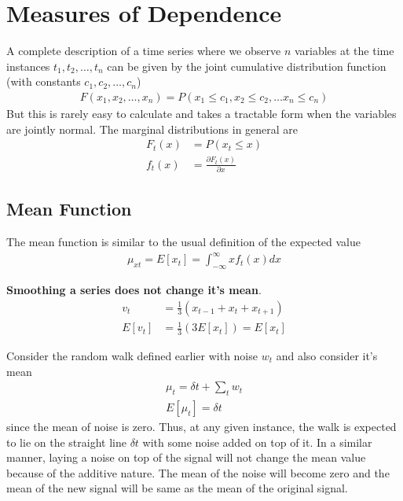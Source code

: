 \documentclass[../../time_series_notes.tex]{subfiles}
\begin{document}
\section{Measures of Dependence}
A complete description of a time series where we observe $n$ variables at the time instances $t_{1}, t_{2}, \ldots, t_{n}$ can be given by the joint cumulative distribution function (with constants $c_{1}, c_{2}, \ldots, c_{n}$)
\begin{align*}
    F(x_{1}, x_{2}, \ldots, x_{n}) = P(x_{1} \leq c_{1}, x_{2} \leq c_{2}, \ldots x_{n} \leq c_{n})
\end{align*}
But this is rarely easy to calculate and takes a tractable form when the variables are jointly normal. The marginal distributions in general are
\begin{align*}
    F_{t}(x) &= P(x_{t} \leq x)\\
    f_{t}(x) &= \frac{\partial F_{t}(x)}{\partial x}
\end{align*}


\subsection{Mean Function} \label{mean_fun}
The mean function is similar to the usual definition of the expected value
\begin{align*}
    \mu_{xt} = E[x_{t}] =  \int_{-\infty}^{\infty} x f_{t}(x) dx
\end{align*}

\textbf{Smoothing a series does not change it's mean}.
\begin{align*}
    v_{t} &= \frac{1}{3}(x_{t-1} + x_{t} + x_{t+1})\\
    E[v_{t}] &= \frac{1}{3}(3E[x_{t}]) = E[x_{t}]
\end{align*}

Consider the random walk defined earlier with noise $w_{t}$ and also consider it's mean
\begin{align*}
    \mu_{t} = \delta t + \sum_{t} w_{t}\\
    E[\mu_{t}] = \delta t
\end{align*}
since the mean of noise is zero. Thus, at any given instance, the walk is expected to lie on the straight line $\delta t$ with some noise added on top of it.\newline
In a similar manner, laying a noise on top of the signal will not change the mean value because of the additive nature. The mean of the noise will become zero and the mean of the new signal will be same as the mean of the original signal.
\end{document}
